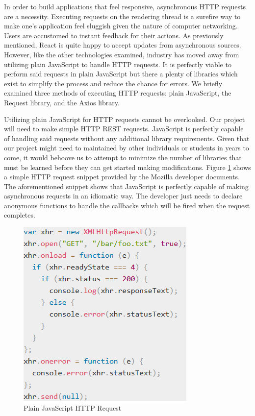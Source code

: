\documentclass[12pt]{report}
\begin{document}
\begin{enumerate}
In order to build applications that feel responsive, asynchronous HTTP requests are a necessity. Executing requests on the rendering thread is a surefire way to make one's application feel sluggish given the nature of computer networking. Users are accustomed to instant feedback for their actions. As previously mentioned, React is quite happy to accept updates from asynchronous sources. However, like the other technologies examined, industry has moved away from utilizing plain JavaScript to handle HTTP requests. It is perfectly viable to perform said requests in plain JavaScript but there a plenty of libraries which exist to simplify the process and reduce the chance for errors. We briefly examined three methods of executing HTTP requests: plain JavaScript, the Request library, and the Axios library.

Utilizing plain JavaScript for HTTP requests cannot be overlooked. Our project will need to make simple HTTP REST requests. JavaScript is perfectly capable of handling said requests without any additional library requirements. Given that our project might need to maintained by other individuals or students in years to come, it would behoove us to attempt to minimize the number of libraries that must be learned before they can get started making modifications. Figure \ref{fig:javascripthttprequest} shows a simple HTTP request snippet provided by the Mozilla developer documents.\cite{mozillahttprequest} The aforementioned snippet shows that JavaScript is perfectly capable of making asynchronous requests in an idiomatic way. The developer just needs to declare anonymous functions to handle the callbacks which will be fired when the request completes.

\begin{figure}[h]
	\centering
	\includegraphics[scale=0.5]{javascript_http_request}
	\caption{Plain JavaScript HTTP Request}
	\label{fig:javascripthttprequest}
\end{figure}


\end{enumerate}
\end{document}
